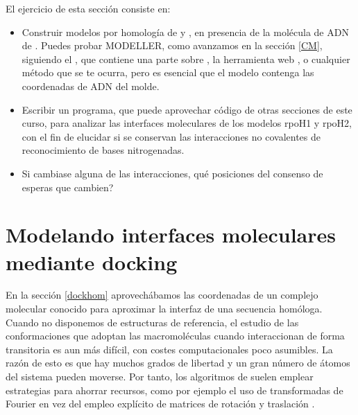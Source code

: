 El ejercicio de esta secci\'{o}n consiste en:
\begin{itemize}

\item Construir modelos por homolog\'{i}a de 
 y
, en presencia de la mol\'{e}cula de ADN de 
. Puedes probar MODELLER, 
como avanzamos en la secci\'{o}n \ref{CM}, siguiendo el 
, que contiene una parte sobre 
, la herramienta web 
, o cualquier m\'{e}todo que se te ocurra, 
pero es esencial que el modelo contenga las coordenadas de ADN del molde.

\item Escribir un programa, que puede aprovechar c\'{o}digo de otras secciones de este curso, para analizar las interfaces
moleculares de los modelos rpoH1 y rpoH2, con el fin de elucidar si se conservan las interacciones no covalentes
de reconocimiento de bases nitrogenadas.

\item Si cambiase alguna de las interacciones, qu\'{e} posiciones del consenso de 
esperas que cambien?

\end{itemize}





\section{Modelando interfaces moleculares mediante docking}

En la secci\'{o}n \ref{dockhom} aprovech\'{a}bamos las coordenadas de un complejo molecular conocido
para aproximar la interfaz de una secuencia hom\'{o}loga. Cuando no disponemos de estructuras 
de referencia, el estudio de las conformaciones que adoptan las macromol\'{e}culas cuando interaccionan 
de forma transitoria es aun m\'{a}s dif\'{i}cil, con costes computacionales poco asumibles.
La raz\'{o}n de esto es que hay muchos grados de libertad y un gran n\'{u}mero de \'{a}tomos del sistema pueden moverse. 
Por tanto, los algoritmos de  
suelen emplear estrategias para ahorrar recursos, como por ejemplo el uso de transformadas de Fourier en vez del empleo 
expl\'{i}cito de matrices de rotaci\'{o}n y traslaci\'{o}n \citep{Katchalski1992}.

